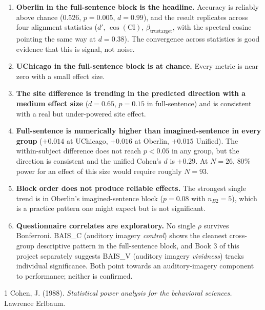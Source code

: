 \documentclass[11pt]{article}
\begin{document}
\begin{enumerate}
\item \textbf{Oberlin in the full-sentence block is the headline.}
      Accuracy is reliably above chance ($0.526$, $p=0.005$, $d=0.99$),
      and the result replicates across four
      alignment statistics ($d'$, $\cos(\mathrm{CI})$,
      $\beta_{\text{truetarget}}$, with the spectral cosine pointing
      the same way at $d=0.38$).  The convergence across statistics is good evidence that this is signal, not noise.

\item \textbf{UChicago in the full-sentence block is at chance.}
      Every metric is near zero with a small effect size.

\item \textbf{The site difference is trending in the predicted
      direction with a medium effect size} ($d=0.65$, $p=0.15$ in
      full-sentence) and is consistent with a real but under-powered
      site effect.  

\item \textbf{Full-sentence is numerically higher than imagined-sentence
      in every group} ($+0.014$ at UChicago, $+0.016$ at Oberlin,
      $+0.015$ Unified).  The within-subject difference does not
      reach $p < 0.05$ in any group, but the direction is consistent
      and the unified Cohen's $d$ is $+0.29$.  At $N=26$, $80\%$
      power for an effect of this size would require roughly $N=93$.

\item \textbf{Block order does not produce reliable effects.}  The
      strongest single trend is in Oberlin's imagined-sentence block
      ($p=0.08$ with $n_{B2}=5$), which is a practice
      pattern one might expect but is not significant.

\item \textbf{Questionnaire correlates are exploratory.}  No single
      $\rho$ survives Bonferroni.  BAIS\_C (auditory imagery
      \emph{control}) shows the cleanest cross-group descriptive
      pattern in the full-sentence block, and Book 3 of this project
      separately suggests BAIS\_V (auditory imagery
      \emph{vividness}) tracks individual significance.  Both point
      towards an auditory-imagery component to performance; neither
      is confirmed.
\end{enumerate}

\bigskip
\noindent

\begin{thebibliography}{1}
 Cohen, J. (1988).
  \emph{Statistical power analysis for the behavioral sciences.}
  Lawrence Erlbaum.
\end{thebibliography}
\end{document}
